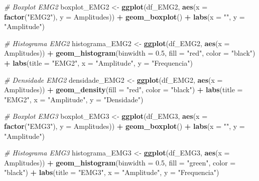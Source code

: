 \documentclass[
]{article}
\newenvironment{Shaded}{\begin{snugshade}}{\end{snugshade}}
\newcommand{\AttributeTok}[1]{\textcolor[rgb]{0.13,0.29,0.53}{#1}}
\newcommand{\CommentTok}[1]{\textcolor[rgb]{0.56,0.35,0.01}{\textit{#1}}}
\newcommand{\FloatTok}[1]{\textcolor[rgb]{0.00,0.00,0.81}{#1}}
\newcommand{\FunctionTok}[1]{\textcolor[rgb]{0.13,0.29,0.53}{\textbf{#1}}}
\newcommand{\NormalTok}[1]{#1}
\newcommand{\OtherTok}[1]{\textcolor[rgb]{0.56,0.35,0.01}{#1}}
\newcommand{\SpecialCharTok}[1]{\textcolor[rgb]{0.81,0.36,0.00}{\textbf{#1}}}
\newcommand{\StringTok}[1]{\textcolor[rgb]{0.31,0.60,0.02}{#1}}
\begin{document}
\begin{Shaded}
\begin{Highlighting}[]
\CommentTok{\# Boxplot EMG2}
\NormalTok{boxplot\_EMG2 }\OtherTok{\textless{}{-}} \FunctionTok{ggplot}\NormalTok{(df\_EMG2, }\FunctionTok{aes}\NormalTok{(}\AttributeTok{x =} \FunctionTok{factor}\NormalTok{(}\StringTok{"EMG2"}\NormalTok{), }\AttributeTok{y =}\NormalTok{ Amplitudes)) }\SpecialCharTok{+}
  \FunctionTok{geom\_boxplot}\NormalTok{() }\SpecialCharTok{+}
  \FunctionTok{labs}\NormalTok{(}\AttributeTok{x =} \StringTok{""}\NormalTok{, }\AttributeTok{y =} \StringTok{"Amplitude"}\NormalTok{) }

\CommentTok{\# Histograma EMG2}
\NormalTok{histograma\_EMG2 }\OtherTok{\textless{}{-}} \FunctionTok{ggplot}\NormalTok{(df\_EMG2, }\FunctionTok{aes}\NormalTok{(}\AttributeTok{x =}\NormalTok{ Amplitudes)) }\SpecialCharTok{+}
  \FunctionTok{geom\_histogram}\NormalTok{(}\AttributeTok{binwidth =} \FloatTok{0.5}\NormalTok{, }\AttributeTok{fill =} \StringTok{"red"}\NormalTok{, }\AttributeTok{color =} \StringTok{"black"}\NormalTok{) }\SpecialCharTok{+}
  \FunctionTok{labs}\NormalTok{(}\AttributeTok{title =} \StringTok{"EMG2"}\NormalTok{, }\AttributeTok{x =} \StringTok{"Amplitude"}\NormalTok{, }\AttributeTok{y =} \StringTok{"Frequencia"}\NormalTok{) }

\CommentTok{\# Densidade EMG2}
\NormalTok{densidade\_EMG2 }\OtherTok{\textless{}{-}} \FunctionTok{ggplot}\NormalTok{(df\_EMG2, }\FunctionTok{aes}\NormalTok{(}\AttributeTok{x =}\NormalTok{ Amplitudes)) }\SpecialCharTok{+}
  \FunctionTok{geom\_density}\NormalTok{(}\AttributeTok{fill =} \StringTok{"red"}\NormalTok{, }\AttributeTok{color =} \StringTok{"black"}\NormalTok{) }\SpecialCharTok{+}
  \FunctionTok{labs}\NormalTok{(}\AttributeTok{title =} \StringTok{"EMG2"}\NormalTok{, }\AttributeTok{x =} \StringTok{"Amplitude"}\NormalTok{, }\AttributeTok{y =} \StringTok{"Densidade"}\NormalTok{)}

\CommentTok{\# Boxplot EMG3}
\NormalTok{boxplot\_EMG3 }\OtherTok{\textless{}{-}} \FunctionTok{ggplot}\NormalTok{(df\_EMG3, }\FunctionTok{aes}\NormalTok{(}\AttributeTok{x =} \FunctionTok{factor}\NormalTok{(}\StringTok{"EMG3"}\NormalTok{), }\AttributeTok{y =}\NormalTok{ Amplitudes)) }\SpecialCharTok{+}
  \FunctionTok{geom\_boxplot}\NormalTok{() }\SpecialCharTok{+}
  \FunctionTok{labs}\NormalTok{(}\AttributeTok{x =} \StringTok{""}\NormalTok{, }\AttributeTok{y =} \StringTok{"Amplitude"}\NormalTok{) }

\CommentTok{\# Histograma EMG3}
\NormalTok{histograma\_EMG3 }\OtherTok{\textless{}{-}} \FunctionTok{ggplot}\NormalTok{(df\_EMG3, }\FunctionTok{aes}\NormalTok{(}\AttributeTok{x =}\NormalTok{ Amplitudes)) }\SpecialCharTok{+}
  \FunctionTok{geom\_histogram}\NormalTok{(}\AttributeTok{binwidth =} \FloatTok{0.5}\NormalTok{, }\AttributeTok{fill =} \StringTok{"green"}\NormalTok{, }\AttributeTok{color =} \StringTok{"black"}\NormalTok{) }\SpecialCharTok{+}
  \FunctionTok{labs}\NormalTok{(}\AttributeTok{title =} \StringTok{"EMG3"}\NormalTok{, }\AttributeTok{x =} \StringTok{"Amplitude"}\NormalTok{, }\AttributeTok{y =} \StringTok{"Frequencia"}\NormalTok{)}


\end{Highlighting}
\end{Shaded}
\end{document}
